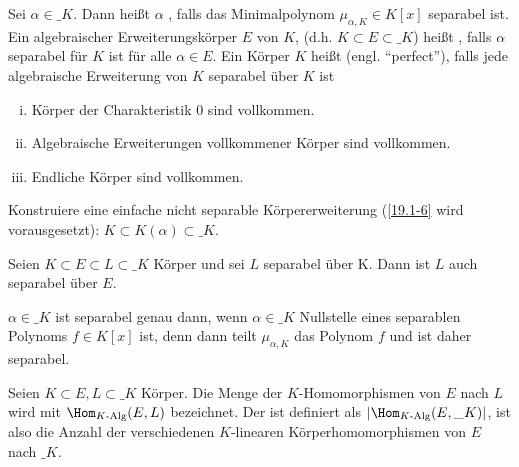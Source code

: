 \begin{df} \label{dup:19.1-9}
	Sei $\alpha \in \_K$.
	Dann heißt $\alpha$ , falls das Minimalpolynom $\mu_{\alpha, K} \in K[x]$ separabel ist.
	Ein algebraischer Erweiterungskörper $E$ von $K$, (d.h. $K \subset E \subset \_K$) heißt , falls $\alpha$ separabel für $K$ ist für alle $\alpha \in E$.
	Ein Körper $K$ heißt  (engl. “perfect”), falls jede algebraische Erweiterung von $K$ separabel über $K$ ist
\end{df}

\setcounter{thm}{5}
\begin{kor} \label{19.1-6}
	\begin{enumerate}[i)]
		\item
			Körper der Charakteristik $0$ sind vollkommen.
		\item
			Algebraische Erweiterungen vollkommener Körper sind vollkommen.
		\item
			Endliche Körper sind vollkommen.
	\end{enumerate}
\end{kor}

\begin{ex} \label{dup:19.1-7}
	Konstruiere eine einfache nicht separable Körpererweiterung (\ref{19.1-6} wird vorausgesetzt): $K \subset K(\alpha) \subset \_K$.
\end{ex}

\begin{lem} \label{19.1-8}
	Seien $K \subset E \subset L \subset \_K$ Körper und sei $L$ separabel über K.
	Dann ist $L$ auch separabel über $E$.
\end{lem}

\begin{nt} \label{19.1-9}
	$\alpha \in \_K$ ist separabel genau dann, wenn $\alpha \in \_K$ Nullstelle eines separablen Polynoms $f \in K[x]$ ist, denn dann teilt $\mu_{\alpha, K}$ das Polynom $f$ und ist daher separabel.
\end{nt}

\begin{df} \label{19.1-10}
	Seien $K \subset E, L \subset \_K$ Körper.
	Die Menge der $K$-Homomorphismen von $E$ nach $L$ wird mit $\Hom_{K\text{-Alg}}(E, L)$ bezeichnet.
	Der  ist definiert als $|\Hom_{K\text{-Alg}}(E, \_K)|$, ist also die Anzahl der verschiedenen $K$-linearen Körperhomomorphismen von $E$ nach $\_K$.
\end{df}

